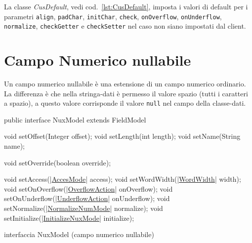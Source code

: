 \documentclass[a4paper,10pt]{report}
\newif\ifesource
\newenvironment{elisting}[1][H]
  {\captionsetup{aboveskip=0pt}\begin{listing}[#1]}
  {\end{listing}%
}
\begin{document}
La classe \textsl{CusDefault}, vedi cod.~\ref{lst:CusDefault}, imposta i valori
di default per i parametri \verb!align!, \verb!padChar!, \verb!initChar!, 
\verb!check!, \verb!onOverflow!, \verb!onUnderflow!, \verb!normalize!, 
\verb!checkGetter! e \verb!checkSetter! nel caso non siano  impostati dal 
client.


\section{Campo Numerico nullabile}
Un campo numerico nullabile è una estensione di un campo numerico ordinario.
La differenza è che nella stringa-dati è permesso il valore spazio (tutti i
caratteri a spazio), a questo valore corrisponde il valore \verb!null! nel 
campo della classe-dati.

\ifesource
\begin{figure*}[!htb]
\begin{lstlisting}[language=java, 
caption=interfaccia NuxModel (campo numerico nullabile), 
label=lst:NuxModel]
public interface NuxModel extends FieldModel {
    void setOffset(Integer offset);
    void setLength(int length);
    void setName(String name);

    void setOverride(boolean override);

    void setAccess((*\hyperref[lst:AccesMode]{AccesMode}*) access);
    void setWordWidth((*\hyperref[lst:WordWidth]{WordWidth}*) width);
    void setOnOverflow((*\hyperref[lst:OverflowAction]{OverflowAction}*) onOverflow);
    void setOnUnderflow((*\hyperref[lst:UnderflowAction]{UnderflowAction}*) onUnderflow);
    void setNormalize((*\hyperref[lst:NormalizeNumMode]{NormalizeNumMode}*) normalize);
    void setInitialize((*\hyperref[lst:InitializeNuxMode]{InitializeNuxMode}*) initialize);
}
\end{lstlisting}\index{NuxModel}
\end{figure*}
\else
\begin{elisting}[!htb]
\begin{javacode}
public interface NuxModel extends FieldModel {
    void setOffset(Integer offset);
    void setLength(int length);
    void setName(String name);

    void setOverride(boolean override);

    void setAccess(|\hyperref[lst:AccesMode]{AccesMode}| access);
    void setWordWidth(|\hyperref[lst:WordWidth]{WordWidth}| width);
    void setOnOverflow(|\hyperref[lst:OverflowAction]{OverflowAction}| onOverflow);
    void setOnUnderflow(|\hyperref[lst:UnderflowAction]{UnderflowAction}| onUnderflow);
    void setNormalize(|\hyperref[lst:NormalizeNumMode]{NormalizeNumMode}| normalize);
    void setInitialize(|\hyperref[lst:InitializeNuxMode]{InitializeNuxMode}| initialize);
}
\end{javacode}
\caption{interfaccia NuxModel (campo numerico nullabile)}
\label{lst:NuxModel}
\end{elisting}
\fi
\end{document}
